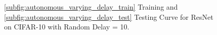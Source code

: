 \begin{figure}[h]
\vspace*{-12pt}
\centering
{}
\vspace*{-6pt}
\caption{\ref{subfig:autonomous_varying_delay_train} Training and \ref{subfig:autonomous_varying_delay_test} Testing Curve for ResNet on CIFAR-10 with Random Delay = 10.}
\label{fig:autonomous_varying_delay_result}
\end{figure}